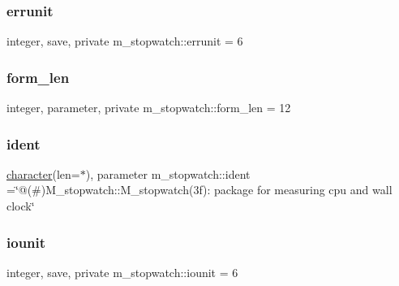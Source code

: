 \mbox{\label{namespacem__stopwatch_a1a56c421f8dda3ea8ff78ee49d1d4e11}} 
\subsubsection{\texorpdfstring{errunit}{errunit}}
{\footnotesize\ttfamily integer, save, private m\+\_\+stopwatch\+::errunit = 6\hspace{0.3cm}{\ttfamily [private]}}

\mbox{\label{namespacem__stopwatch_ae96391d876b6e7b05510e339a2e68d20}} 
\subsubsection{\texorpdfstring{form\+\_\+len}{form\_len}}
{\footnotesize\ttfamily integer, parameter, private m\+\_\+stopwatch\+::form\+\_\+len = 12\hspace{0.3cm}{\ttfamily [private]}}

\mbox{\label{namespacem__stopwatch_a8c8ff2f2cb941e044ea889e7c728c8eb}} 
\subsubsection{\texorpdfstring{ident}{ident}}
{\footnotesize\ttfamily \hyperlink{option__stopwatch_83_8txt_abd4b21fbbd175834027b5224bfe97e66}{character}(len=$\ast$), parameter m\+\_\+stopwatch\+::ident =\char`\"{}@(\#)M\+\_\+stopwatch\+::\+M\+\_\+stopwatch(3f)\+: package for measuring cpu and wall clock\char`\"{}\hspace{0.3cm}{\ttfamily [private]}}

\mbox{\label{namespacem__stopwatch_a3f5d3edd3b740437b0e59f64bc956402}} 
\subsubsection{\texorpdfstring{iounit}{iounit}}
{\footnotesize\ttfamily integer, save, private m\+\_\+stopwatch\+::iounit = 6\hspace{0.3cm}{\ttfamily [private]}}

